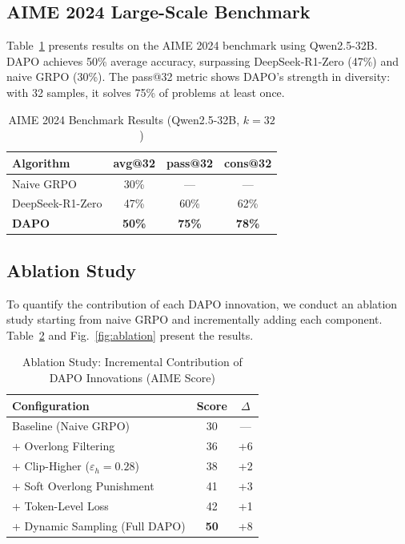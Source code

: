 \subsection{AIME 2024 Large-Scale Benchmark}

Table~\ref{tab:aime} presents results on the AIME 2024 benchmark using Qwen2.5-32B. DAPO achieves 50\% average accuracy, surpassing DeepSeek-R1-Zero (47\%) and naive GRPO (30\%). The pass@32 metric shows DAPO's strength in diversity: with 32 samples, it solves 75\% of problems at least once.

\begin{table}[ht]
\centering
\caption{AIME 2024 Benchmark Results (Qwen2.5-32B, $k{=}32$)}
\label{tab:aime}
\begin{tabular}{lccc}
\toprule
\textbf{Algorithm} & \textbf{avg@32} & \textbf{pass@32} & \textbf{cons@32} \\
\midrule
Naive GRPO & 30\% & --- & --- \\
DeepSeek-R1-Zero & 47\% & 60\% & 62\% \\
\textbf{DAPO} & \textbf{50\%} & \textbf{75\%} & \textbf{78\%} \\
\bottomrule
\end{tabular}
\end{table}

\subsection{Ablation Study}

To quantify the contribution of each DAPO innovation, we conduct an ablation study starting from naive GRPO and incrementally adding each component. Table~\ref{tab:ablation} and Fig.~\ref{fig:ablation} present the results.

\begin{table}[ht]
\centering
\caption{Ablation Study: Incremental Contribution of DAPO Innovations (AIME Score)}
\label{tab:ablation}
\begin{tabular}{lcc}
\toprule
\textbf{Configuration} & \textbf{Score} & \textbf{$\Delta$} \\
\midrule
Baseline (Naive GRPO) & 30 & --- \\
+ Overlong Filtering & 36 & +6 \\
+ Clip-Higher ($\varepsilon_h = 0.28$) & 38 & +2 \\
+ Soft Overlong Punishment & 41 & +3 \\
+ Token-Level Loss & 42 & +1 \\
+ Dynamic Sampling (Full DAPO) & \textbf{50} & +8 \\
\bottomrule
\end{tabular}
\end{table}

